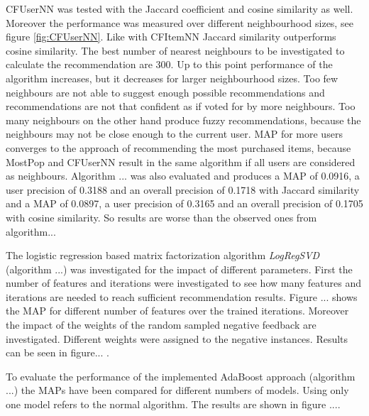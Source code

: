 \documentclass[10pt]{reportMaster}
\begin{document}
CFUserNN was tested with the Jaccard coefficient and cosine similarity as well.
Moreover the performance was measured over different neighbourhood sizes, see figure \ref{fig:CFUserNN}.
Like with CFItemNN Jaccard similarity outperforms cosine similarity.
The best number of nearest neighbours to be investigated to calculate the recommendation are 300.
Up to this point performance of the algorithm increases, but it decreases for larger neighbourhood sizes.
Too few neighbours are not able to suggest enough possible recommendations and recommendations are not that confident as if voted for by more neighbours.
Too many neighbours on the other hand produce fuzzy recommendations, because the neighbours may not be close enough to the current user.
MAP for more users converges to the approach of recommending the most purchased items, because MostPop and CFUserNN result in the same algorithm if all users are considered as neighbours.
Algorithm ... was also evaluated and produces a MAP of 0.0916, a user precision of 0.3188 and an overall precision of 0.1718 with Jaccard similarity and a MAP of 0.0897, a user precision of 0.3165 and an overall precision of 0.1705 with cosine similarity. %
So results are worse than the observed ones from algorithm... %

The logistic regression based matrix factorization algorithm \textit{LogRegSVD} (algorithm ...) was investigated for the impact of different parameters. %
First the number of features and iterations were investigated to see how many features and iterations are needed to reach sufficient recommendation results.
Figure ... shows the MAP for different number of features over the trained iterations. %
Moreover the impact of the weights of the random sampled negative feedback are investigated.
Different weights were assigned to the negative instances. Results can be seen in figure... . %

To evaluate the performance of the implemented AdaBoost approach (algorithm ...) the MAPs have been compared for different numbers of models. %
Using only one model refers to the normal  algorithm.
The results are shown in figure .... %
\end{document}
